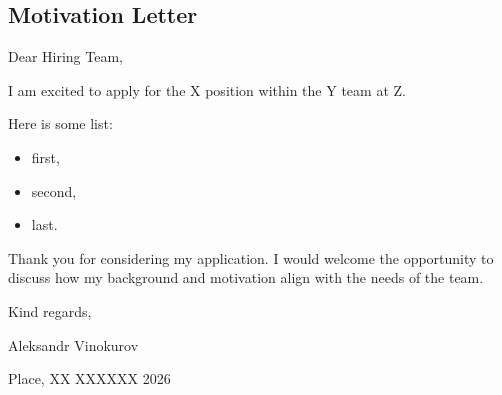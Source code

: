 \documentclass[letterpaper, 11pt]{article}
\begin{document}

\subsection*{Motivation Letter}

\vspace{2em}

Dear Hiring Team,

\vspace{1em}

I am excited to apply for the X position within the Y team at Z.

\vspace{1em}

Here is some list:

\vspace{1em}

\begin{itemize}[noitemsep, nosep]
  \item first,
  \item second,
  \item last.
\end{itemize}

\vspace{1em}

Thank you for considering my application. I would welcome the opportunity to discuss how my background and motivation align with the needs of the team.

\vspace{1em}

Kind regards,

Aleksandr Vinokurov

\vspace{1em}

Place, XX XXXXXX 2026
\end{document}
